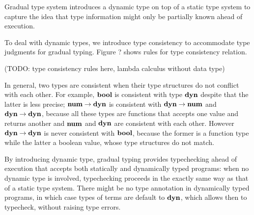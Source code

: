 Gradual type system introduces a dynamic type on top of a static type system
to capture the idea that type information might only be partially known
ahead of execution.

To deal with dynamic types, we introduce type consistency
to accommodate type judgments for gradual typing.
Figure ? shows rules for type consistency relation.

(TODO: type consistency rules here, lambda calculus without data type)

In general, two types are consistent when
their type structures do not conflict with each other.
For example, $\textbf{bool}$ is consistent with type $\textbf{dyn}$
despite that the latter is less precise;
$\textbf{num} \rightarrow \textbf{dyn}$ is consistent with $\textbf{dyn} \rightarrow \textbf{num}$ and $\textbf{dyn} \rightarrow \textbf{dyn}$,
because all these types are functions that accepts one value and returns another and
$\textbf{num}$ and $\textbf{dyn}$ are consistent with each other.
However $\textbf{dyn} \rightarrow \textbf{dyn}$ is never consistent with $\textbf{bool}$,
because the former is a function type while the latter a boolean value,
whose type structures do not match.

By introducing dynamic type, gradual typing provides
typechecking ahead of execution that accepts both statically and dynamically typed programs: 
when no dynamic type is involved, typechecking proceeds in the
exactly same way as that of a static type system.
There might be no type annotation in dynamically typed programs,
in which case types of terms are default to $\textbf{dyn}$, which allows
then to typecheck, without raising type errors.







